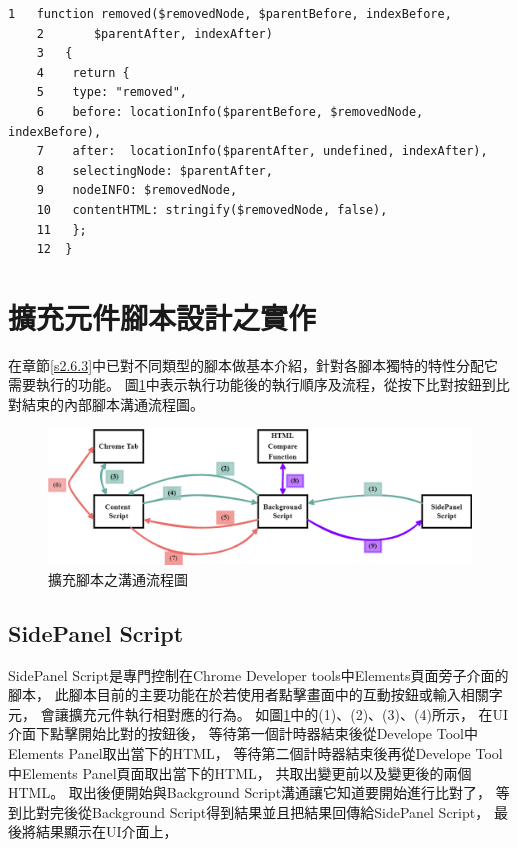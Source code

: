 \begin{lstlisting}[caption=比對輸出結果(removed類型), label={l3.3}]
    1   function removed($removedNode, $parentBefore, indexBefore, 
    2       $parentAfter, indexAfter) 
    3   {
    4    return {
    5    type: "removed",
    6    before: locationInfo($parentBefore, $removedNode, indexBefore),
    7    after:  locationInfo($parentAfter, undefined, indexAfter),
    8    selectingNode: $parentAfter,
    9    nodeINFO: $removedNode,
    10   contentHTML: stringify($removedNode, false),
    11   };
    12  }
\end{lstlisting}


\section{擴充元件腳本設計之實作}\label{s3.4}
\indent
在章節\ref{s2.6.3}中已對不同類型的腳本做基本介紹，針對各腳本獨特的特性分配它需要執行的功能。
圖\ref{f3.7}中表示執行功能後的執行順序及流程，從按下比對按鈕到比對結束的內部腳本溝通流程圖。

\indent

\begin{figure}[H]
    \centering
    \includegraphics[width=1\textwidth]{picture/ch3-script-structure.png}
    \caption{擴充腳本之溝通流程圖}
    \label{f3.7}
\end{figure}

\subsection{SidePanel Script}\label{s3.4.1}
SidePanel Script是專門控制在Chrome Developer tools中Elements頁面旁子介面的腳本，
此腳本目前的主要功能在於若使用者點擊畫面中的互動按鈕或輸入相關字元，
會讓擴充元件執行相對應的行為。
如圖\ref{f3.7}中的(1)、(2)、(3)、(4)所示，
在UI介面下點擊開始比對的按鈕後，
等待第一個計時器結束後從Develope Tool中Elements Panel取出當下的HTML，
等待第二個計時器結束後再從Develope Tool中Elements Panel頁面取出當下的HTML，
共取出變更前以及變更後的兩個HTML。
取出後便開始與Background Script溝通讓它知道要開始進行比對了，
等到比對完後從Background Script得到結果並且把結果回傳給SidePanel Script，
最後將結果顯示在UI介面上，


